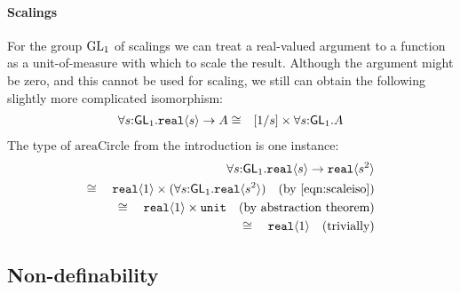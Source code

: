 \paragraph{Scalings}
For the group $\mathrm{GL}_1$ of scalings we can treat
a real-valued argument to a function as a unit-of-measure with
which to scale the result. 
Although the argument might be zero, and this cannot be used for scaling,
we still can obtain the following slightly more complicated
isomorphism:
\begin{eqnarray}
\forall s\mathord:\mathsf{GL}_1.\textup{\texttt{real}}\langle s \rangle\to A &
\cong & [1/s]\times \forall s\mathord:\mathsf{GL}_1.A\label{eqn:scaleiso}
\end{eqnarray}
The type of $\mathrm{areaCircle}$ from the introduction is one instance:
\begin{align*}
\forall s\mathord:\mathsf{GL}_1.\textup{\texttt{real}}\langle s \rangle\to\textup{\texttt{real}}\langle s^2 \rangle\\ 
\cong\quad\textup{\texttt{real}}\langle 1 \rangle\times(\forall
s\mathord:\mathsf{GL}_1.\textup{\texttt{real}}\langle s^2 \rangle) \quad(\text{by }\ref{eqn:scaleiso})\\ 
\cong\quad\textup{\texttt{real}}\langle 1 \rangle\times \texttt{unit} \quad (\text{by abstraction theorem})\\
\cong\quad\textup{\texttt{real}}\langle 1 \rangle\quad (\text{trivially})
\end{align*}

\subsection{Non-definability}
\label{sec:types-indexed-abelian-groups-indef}

